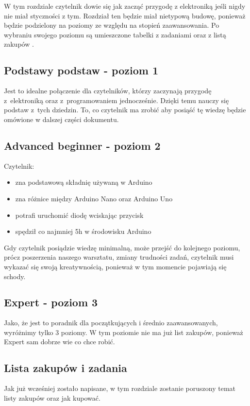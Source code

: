 
W tym rozdziale czytelnik dowie się jak zacząć przygodę z elektroniką jeśli nigdy nie miał styczności z tym. Rozdział ten będzie miał
nietypową budowę, ponieważ będzie podzielony na poziomy ze względu na stopień zaawansowania. Po wybraniu swojego poziomu są umieszczone tabelki z zadaniami oraz z listą zakupów .
\subsection{Podstawy podstaw - poziom 1}
Jest to idealne połączenie dla czytelników, którzy zaczynają przygodę z~elektroniką oraz z~programowaniem jednocześnie. Dzięki temu nauczy się podstaw z~tych dziedzin. 
To, co czytelnik ma zrobić aby posiąść tę wiedzę będzie omówione w dalszej części dokumentu.
\subsection{Advanced beginner - poziom 2}
Czytelnik:
\begin{itemize}
\item zna podstawową składnię używaną w Arduino
\item zna różnice między Arduino Nano oraz Arduino Uno
\item potrafi uruchomić diodę wciskając przycisk
\item spędził co najmniej 5h w środowisku Arduino
\end{itemize}

Gdy czytelnik posiądzie wiedzę minimalną, może przejść do kolejnego poziomu, prócz poszerzenia naszego warsztatu, zmiany trudności zadań, czytelnik musi wykazać się swoją kreatywnością, ponieważ w tym momencie pojawiają się schody.

\subsection{Expert - poziom 3}
Jako, że jest to poradnik dla początkujących i średnio zaawansowanych, wyróżnimy tylko 3 poziomy. W tym poziomie nie ma już list zakupów, ponieważ Expert sam dobrze wie co chce robić.
\subsection{Lista zakupów i zadania}
Jak już wcześniej zostało napisane, w tym rozdziale zostanie poruszony temat listy zakupów oraz jak kupować.

